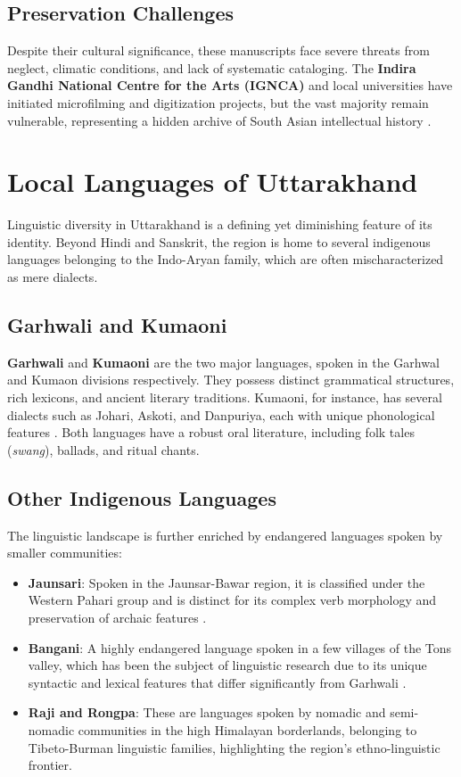 \documentclass[12pt]{article}
\begin{document}
\subsection{Preservation Challenges}
Despite their cultural significance, these manuscripts face severe threats from neglect, climatic conditions, and lack of systematic cataloging. The \textbf{Indira Gandhi National Centre for the Arts (IGNCA)} and local universities have initiated microfilming and digitization projects, but the vast majority remain vulnerable, representing a hidden archive of South Asian intellectual history \cite{ignca2019report}.

\section{Local Languages of Uttarakhand}
Linguistic diversity in Uttarakhand is a defining yet diminishing feature of its identity. Beyond Hindi and Sanskrit, the region is home to several indigenous languages belonging to the Indo-Aryan family, which are often mischaracterized as mere dialects.

\subsection{Garhwali and Kumaoni}
\textbf{Garhwali} and \textbf{Kumaoni} are the two major languages, spoken in the Garhwal and Kumaon divisions respectively. They possess distinct grammatical structures, rich lexicons, and ancient literary traditions. Kumaoni, for instance, has several dialects such as Johari, Askoti, and Danpuriya, each with unique phonological features \cite{jhonson2009garhwali}. Both languages have a robust oral literature, including folk tales (\textit{swang}), ballads, and ritual chants.

\subsection{Other Indigenous Languages}
The linguistic landscape is further enriched by endangered languages spoken by smaller communities:
\begin{itemize}
    \item \textbf{Jaunsari}: Spoken in the Jaunsar-Bawar region, it is classified under the Western Pahari group and is distinct for its complex verb morphology and preservation of archaic features \cite{chakraborty2015jaunsari}.
    \item \textbf{Bangani}: A highly endangered language spoken in a few villages of the Tons valley, which has been the subject of linguistic research due to its unique syntactic and lexical features that differ significantly from Garhwali \cite{zoller1997bangan}.
    \item \textbf{Raji and Rongpa}: These are languages spoken by nomadic and semi-nomadic communities in the high Himalayan borderlands, belonging to Tibeto-Burman linguistic families, highlighting the region's ethno-linguistic frontier.
\end{itemize}
\end{document}
